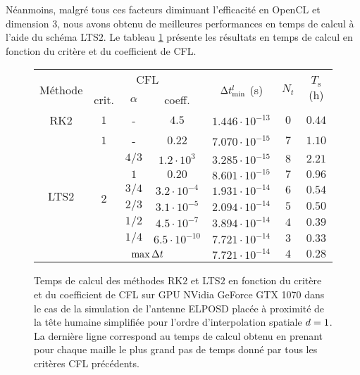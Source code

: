 Néanmoins, malgré tous ces facteurs diminuant l'efficacité
en OpenCL et dimension $3$, nous avons obtenu
de meilleures performances en temps de calcul à l'aide du schéma LTS$2$.
Le tableau \ref{tab:lts2_perfs} présente les résultats en temps de calcul
en fonction du critère et du coefficient de CFL.

\begin{figure}[!h]
	\centering
	\caption{
		\label{tab:lts2_perfs}
		Temps de calcul des méthodes RK$2$ et LTS$2$ en fonction
		du critère et du coefficient de CFL sur GPU NVidia GeForce GTX 1070
		dans le cas de la simulation de l'antenne ELPOSD
		placée à proximité de la tête humaine simplifiée
		pour l'ordre d'interpolation spatiale $d = 1$.
		La dernière ligne correspond au temps de calcul obtenu en prenant pour chaque
		maille le plus grand pas de temps donné par tous les critères CFL précédents.
		}
		
	\begin{tabular}{|c|c|c|c|c|c|c|}
		\hline
		\multirow{2}{*}{Méthode} & \multicolumn{3}{c|}{CFL} & \multirow{2}{*}{$\Delta t_{\min}^l$ (s)} & \multirow{2}{*}{$N_t$} & \multirow{2}{*}{$T_\mathrm{s}$ (h)} \\	\cline{2-4}
		& crit. & $\alpha$ & coeff. & & & \\	\hline\hline
		RK$2$ & $1$ & - & $4.5$ & $1.446 \cdot 10^{-13}$ & $0$ & $0.44$ \\ \hline
		\multirow{8}{*}{LTS$2$} & $1$ & - & $0.22$ & $7.070 \cdot 10^{-15}$ & $7$ & $1.10$ \\ \cline{2-7}
		& \multirow{6}{*}{$2$} & $4/3$ & $1.2 \cdot 10^{3}$ & $3.285 \cdot 10^{-15}$ & $8$ & $2.21$ \\ \cline{3-7}
		& & $1$ & $0.20$ & $8.601 \cdot 10^{-15}$ & $7$ & $0.96$ \\ \cline{3-7}
		& & $3/4$ & $3.2 \cdot 10^{-4}$ & $1.931 \cdot 10^{-14}$ & $6$ & $0.54$ \\ \cline{3-7}
		& & $2/3$ & $3.1 \cdot 10^{-5}$ & $2.094 \cdot 10^{-14}$ & $5$ & $0.50$ \\ \cline{3-7}
		& & $1/2$ & $4.5 \cdot 10^{-7}$ & $3.894 \cdot 10^{-14}$ & $4$ & $0.39$ \\ \cline{3-7}
		& & $1/4$ & $6.5 \cdot 10^{-10}$ & $7.721 \cdot 10^{-14}$ & $3$ & $0.33$ \\ \cline{2-7}
		& \multicolumn{3}{c|}{$\max \Delta t$} & $7.721 \cdot 10^{-14}$ & $4$ & $0.28$ \\ \hline
	\end{tabular}
\end{figure}


